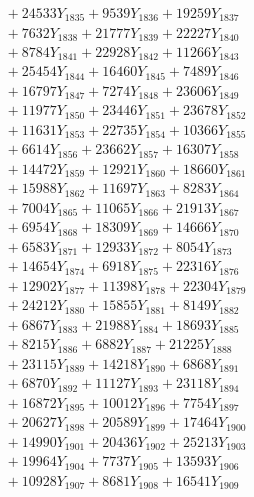 \documentclass[a4paper,10pt]{article}
\begin{document}
{\begin{align}
&\;  + 24533 Y_{1835} + 9539 Y_{1836} + 19259 Y_{1837} \\[0.3ex]
&\;  + 7632 Y_{1838} + 21777 Y_{1839} + 22227 Y_{1840} \\[0.3ex]
&\;  + 8784 Y_{1841} + 22928 Y_{1842} + 11266 Y_{1843} \\[0.3ex]
&\;  + 25454 Y_{1844} + 16460 Y_{1845} + 7489 Y_{1846} \\[0.3ex]
&\;  + 16797 Y_{1847} + 7274 Y_{1848} + 23606 Y_{1849} \\[0.3ex]
&\;  + 11977 Y_{1850} + 23446 Y_{1851} + 23678 Y_{1852} \\[0.3ex]
&\;  + 11631 Y_{1853} + 22735 Y_{1854} + 10366 Y_{1855} \\[0.3ex]
&\;  + 6614 Y_{1856} + 23662 Y_{1857} + 16307 Y_{1858} \\[0.5ex]\allowbreak
&\;  + 14472 Y_{1859} + 12921 Y_{1860} + 18660 Y_{1861} \\[0.3ex]
&\;  + 15988 Y_{1862} + 11697 Y_{1863} + 8283 Y_{1864} \\[0.3ex]
&\;  + 7004 Y_{1865} + 11065 Y_{1866} + 21913 Y_{1867} \\[0.3ex]
&\;  + 6954 Y_{1868} + 18309 Y_{1869} + 14666 Y_{1870} \\[0.3ex]
&\;  + 6583 Y_{1871} + 12933 Y_{1872} + 8054 Y_{1873} \\[0.3ex]
&\;  + 14654 Y_{1874} + 6918 Y_{1875} + 22316 Y_{1876} \\[0.3ex]
&\;  + 12902 Y_{1877} + 11398 Y_{1878} + 22304 Y_{1879} \\[0.3ex]
&\;  + 24212 Y_{1880} + 15855 Y_{1881} + 8149 Y_{1882} \\[0.3ex]
&\;  + 6867 Y_{1883} + 21988 Y_{1884} + 18693 Y_{1885} \\[0.3ex]
&\;  + 8215 Y_{1886} + 6882 Y_{1887} + 21225 Y_{1888} \\[0.5ex]\allowbreak
&\;  + 23115 Y_{1889} + 14218 Y_{1890} + 6868 Y_{1891} \\[0.3ex]
&\;  + 6870 Y_{1892} + 11127 Y_{1893} + 23118 Y_{1894} \\[0.3ex]
&\;  + 16872 Y_{1895} + 10012 Y_{1896} + 7754 Y_{1897} \\[0.3ex]
&\;  + 20627 Y_{1898} + 20589 Y_{1899} + 17464 Y_{1900} \\[0.3ex]
&\;  + 14990 Y_{1901} + 20436 Y_{1902} + 25213 Y_{1903} \\[0.3ex]
&\;  + 19964 Y_{1904} + 7737 Y_{1905} + 13593 Y_{1906} \\[0.3ex]
&\;  + 10928 Y_{1907} + 8681 Y_{1908} + 16541 Y_{1909} \\[0.3ex]

\end{align}}
\end{document}
